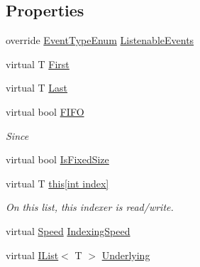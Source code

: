 \subsection*{Properties}
\begin{DoxyCompactItemize}
\item 
override \hyperlink{namespace_c5_a9143bfd561fffa025d21561674758008}{Event\+Type\+Enum} \hyperlink{class_c5_1_1_hashed_array_list_accdd1813a4a5bdff31d1e19d9867c868}{Listenable\+Events}
\item 
virtual T \hyperlink{class_c5_1_1_hashed_array_list_af6ac7881402fcbbbadadd1b1e2f22478}{First}
\item 
virtual T \hyperlink{class_c5_1_1_hashed_array_list_aaa8c79aed9aec799ea687392fc39a028}{Last}
\item 
virtual bool \hyperlink{class_c5_1_1_hashed_array_list_afc96d23115af14b75b10a1b9af9e844c}{F\+I\+F\+O}
\begin{DoxyCompactList}\small\item\em Since \end{DoxyCompactList}\item 
virtual bool \hyperlink{class_c5_1_1_hashed_array_list_a9cdc553cbda54a181c5c00257b3b6486}{Is\+Fixed\+Size}
\item 
virtual T \hyperlink{class_c5_1_1_hashed_array_list_a7122ca8cf35c8a9ec72facf36d2fb360}{this\mbox{[}int index\mbox{]}}
\begin{DoxyCompactList}\small\item\em On this list, this indexer is read/write. \end{DoxyCompactList}\item 
virtual \hyperlink{namespace_c5_a615ba88dcdaa8d5a3c5f833a73d7fad6}{Speed} \hyperlink{class_c5_1_1_hashed_array_list_a60504efec769c7c3d326c5770bd2cd7e}{Indexing\+Speed}
\item 
virtual \hyperlink{interface_c5_1_1_i_list}{I\+List}$<$ T $>$ \hyperlink{class_c5_1_1_hashed_array_list_aa8039fdbfaa6caa1b0f2b4364a43e292}{Underlying}

\end{DoxyCompactItemize}
